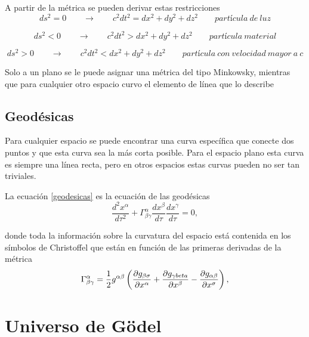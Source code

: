 \documentclass[11pt]{book}
\begin{document}
A partir de la métrica se pueden derivar estas restricciones
\begin{equation} 
ds^2=0 \qquad \to \qquad c^2dt^2=dx^2+dy^2+dz^2 \qquad partícula~ de~ luz 
\end{equation}

\begin{equation}
ds^2<0 \qquad \to \qquad c^2dt^2>dx^2+dy^2+dz^2 \qquad partícula~material
\end{equation}

\begin{equation}
ds^2>0 \qquad \to \qquad c^2dt^2<dx^2+dy^2+dz^2 \qquad partícula~con~velocidad~mayor ~a~c
\end{equation}

Solo a un plano se le puede asignar una métrica del tipo Minkowsky, mientras que para cualquier otro espacio curvo el elemento de línea que lo describe

\section{Geodésicas}

Para cualquier espacio se puede encontrar una curva específica que conecte dos puntos y que esta curva sea la más corta posible. Para el espacio plano esta curva es siempre una línea recta, pero en otros espacios estas curvas pueden no ser tan triviales.

La ecuación \ref{geodesicas} es la ecuación de las geodésicas 
\begin{equation}
\frac{d^2x^\alpha}{d\tau^2}+\Gamma^\alpha_{\beta \gamma} \frac{dx^\beta}{d\tau}\frac{dx^\gamma}{d\tau}=0,
\label{geodesicas}
\end{equation}

donde toda la información sobre la curvatura del espacio está contenida en los símbolos de Christoffel que están en función de las primeras derivadas de la métrica
\begin{equation}
\Gamma^\alpha_{\beta \gamma}=\frac{1}{2}g^{\alpha \beta} \left( \frac{\partial g_{\beta \sigma}}{\partial x^\alpha} + \frac{\partial g_{\gamma \\beta}}{\partial x^\beta} - \frac{\partial g_{\alpha \beta}}{\partial x^\sigma} \right),
\label{christoffel}
\end{equation}



\chapter{Universo de Gödel}
\end{document}
